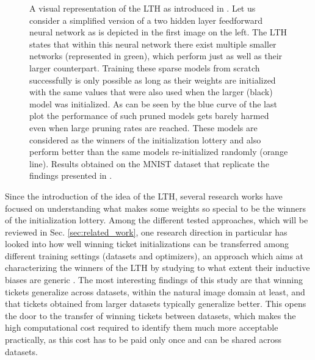 \begin{figure}[!htb]
\endminipage
\caption{A visual representation of the LTH as introduced in \cite{frankle2018lottery}. Let us consider a simplified version of a two hidden layer feedforward neural network as is depicted in the first image on the left. The LTH states that within this neural network there exist multiple smaller networks (represented in green), which perform just as well as their larger counterpart. Training these sparse models from scratch successfully is only possible as long as their weights are initialized with the same values that were also used when the larger (black) model was initialized. As can be seen by the blue curve of the last plot the performance of such pruned models gets barely harmed even when large pruning rates are reached. These models are considered as the winners of the initialization lottery and also perform better than the same models re-initialized randomly (orange line). Results obtained on the MNIST dataset that replicate the findings presented in \cite{frankle2018lottery}.}%
    \label{fig:tickets_visualization}%
\end{figure}



Since the introduction of the idea of the LTH, several research works have focused on understanding what makes some weights so special to be the winners of the initialization lottery. Among the different tested approaches, which will be reviewed in Sec. \ref{sec:related_work}, one research direction in particular has looked into how well winning ticket initializations can be transferred among different training settings (datasets and optimizers), an approach which aims at characterizing the winners of the LTH by studying to what extent their inductive biases are generic \cite{morcos2019one}. The most interesting findings of this study are that winning tickets generalize across datasets, within the natural image domain at least, and that tickets obtained from larger datasets typically generalize better. This opens the door to the transfer of winning tickets between datasets, which makes the high computational cost required to identify them much more acceptable practically, as this cost has to be paid only once and can be shared across datasets.

